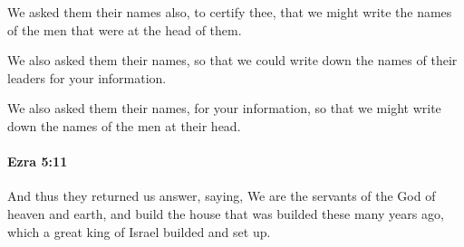 			\begin{versebox}
					\item[BHS] 
					\item[LXX] 
					\item[ASV] We asked them their names also, to certify thee, that we might write the names of the men that were at the head of them.
					\item[NIV] We also asked them their names, so that we could write down the names of their leaders for your information.
					\item[NRSV] We also asked them their names, for your information, so that we might write down the names of the men at their head.
			\end{versebox}

		\paragraph{Ezra 5:11} %
			\label{EZRA-5-11}

			And thus they returned us answer, saying, We are the servants of the God of heaven and earth, and build the house that was builded these many years ago, which a great king of Israel builded and set up.

